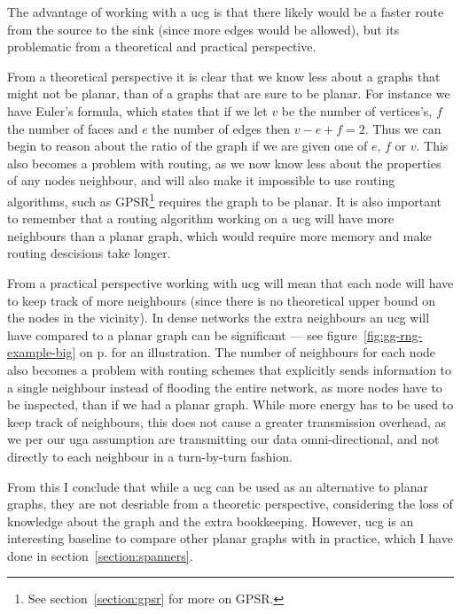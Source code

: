 The advantage of working with a \ac{ucg} is that there likely would be a faster route from the source to the sink (since more edges would be allowed), but its problematic from a theoretical and practical perspective.

From a theoretical perspective it is clear that we know less about a graphs that might not be planar, than of a graphs that are sure to be planar. For instance we have Euler's formula, which states that if we let $v$ be the number of vertices's, $f$ the number of faces and $e$ the number of edges then $v - e + f = 2$. Thus we can begin to reason about the ratio of the graph if we are given one of $e$, $f$ or $v$. This also becomes a problem with routing, as we now know less about the properties of any nodes neighbour, and will also make it impossible to use routing algorithms, such as GPSR\footnote{See section~\ref{section:gpsr} for more on GPSR.} requires the graph to be planar. It is also important to remember that a routing algorithm working on a \ac{ucg} will have more neighbours than a planar graph, which would require more memory and make routing descisions take longer.

From a practical perspective working with \ac{ucg} will mean that each node will have to keep track of more neighbours (since there is no theoretical upper bound on the nodes in the vicinity). In dense networks the extra neighbours an \ac{ucg} will have compared to a planar graph can be significant --- see figure~\ref{fig:gg-rng-example-big} on p. \pageref{fig:gg-rng-example-big} for an illustration. The number of neighbours for each node also becomes a problem with routing schemes that explicitly sends information to a single neighbour instead of flooding the entire network, as more nodes have to be inspected, than if we had a planar graph. While more energy has to be used to keep track of neighbours, this does not cause a greater transmission overhead, as we per our \ac{uga} assumption are transmitting our data omni-directional, and not directly to each neighbour in a turn-by-turn fashion.
 
From this I conclude that while a \ac{ucg} can be used as an alternative to planar graphs, they are not desriable from a theoretic perspective, considering the loss of knowledge about the graph and the extra bookkeeping. However, \ac{ucg} is an interesting baseline to compare other planar graphs with in practice, which I have done in section~\ref{section:spanners}.
 
